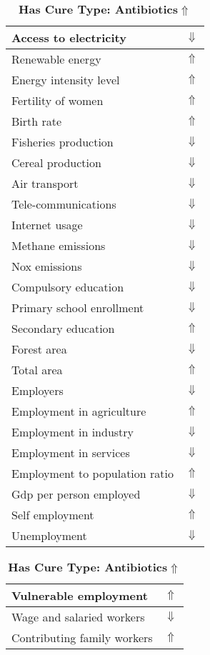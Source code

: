 \documentclass[12pt,notitlepage,oneside]{report}
\begin{document}
\begin{table}[!htb]
\caption{\textbf{Has Cure Type: Antibiotics$ \Uparrow$}}
\centering
\label{Correlated Socio-economic Factors0}
\begin{tabular}{|l|l|}
\hline
Access to electricity & $\Downarrow$\\ \hline
Renewable energy & $\Uparrow$\\ \hline
Energy intensity level & $\Uparrow$\\ \hline
Fertility of women & $\Uparrow$\\ \hline
Birth rate & $\Uparrow$\\ \hline
Fisheries production & $\Downarrow$\\ \hline
Cereal production & $\Downarrow$\\ \hline
Air transport  & $\Downarrow$\\ \hline
Tele-communications & $\Downarrow$\\ \hline
Internet usage & $\Downarrow$\\ \hline
Methane emissions & $\Downarrow$\\ \hline
Nox emissions & $\Downarrow$\\ \hline
Compulsory education & $\Downarrow$\\ \hline
Primary school enrollment & $\Downarrow$\\ \hline
Secondary education & $\Uparrow$\\ \hline
Forest area & $\Downarrow$\\ \hline
Total area & $\Uparrow$\\ \hline
Employers & $\Downarrow$\\ \hline
Employment in agriculture & $\Uparrow$\\ \hline
Employment in industry & $\Downarrow$\\ \hline
Employment in services & $\Downarrow$\\ \hline
Employment to population ratio & $\Uparrow$\\ \hline
Gdp per person employed & $\Downarrow$\\ \hline
Self employment & $\Uparrow$\\ \hline
Unemployment & $\Downarrow$\\ \hline
\end{tabular}
\begin{tabular}{|l|l|}
\hline
Vulnerable employment & $\Uparrow$\\ \hline
Wage and salaried workers & $\Downarrow$\\ \hline
Contributing family workers & $\Uparrow$\\ \hline

\end{tabular}
\end{table}
\end{document}
